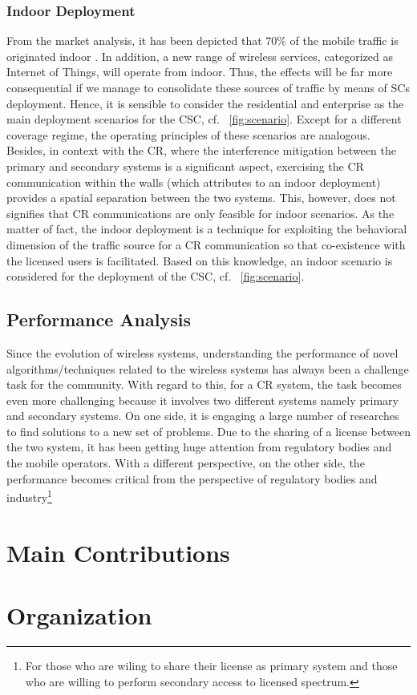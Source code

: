 \subsubsection*{Indoor Deployment}
From the market analysis, it has been depicted that $70\%$ of the mobile traffic is originated indoor \cite{Chander08}. In addition, a new range of wireless services, categorized as Internet of Things, will operate from indoor. Thus, the effects will be far more consequential if we manage to consolidate these sources of traffic by means of SCs deployment. Hence, it is sensible to consider the residential and enterprise as the main deployment scenarios for the CSC, cf. \figurename~\ref{fig:scenario}. Except for a different coverage regime, the operating principles of these scenarios are analogous. Besides, in context with the CR, where the interference mitigation between the primary and secondary systems is a significant aspect, exercising the CR communication within the walls (which attributes to an indoor deployment) provides a spatial separation between the two systems. This, however, does not signifies that CR communications are only feasible for indoor scenarios. As the matter of fact, the indoor deployment is a technique for exploiting the behavioral dimension of the traffic source for a CR communication so that co-existence with the licensed users is facilitated. 
Based on this knowledge, an indoor scenario is considered for the deployment of the CSC, cf. \figurename~\ref{fig:scenario}.  

\subsection{Performance Analysis}
Since the evolution of wireless systems, understanding the performance of novel algorithms/techniques related to the wireless systems has always been a challenge task for the community. With regard to this, for a CR system, the task becomes even more challenging because it involves two different systems namely primary and secondary systems. On one side, it is engaging a large number of researches to find solutions to a new set of problems. 
Due to the sharing of a license between the two system, it has been getting huge attention from regulatory bodies and the mobile operators. With a different perspective, on the other side, the performance becomes critical from the perspective of regulatory bodies and industry\footnote{For those who are wiling to share their license as primary system and those who are willing to perform secondary access to licensed spectrum.}    
\section{Main Contributions}

\section{Organization}
